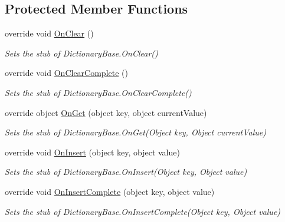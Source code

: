 \subsection*{Protected Member Functions}
\begin{DoxyCompactItemize}
\item 
override void \hyperlink{class_system_1_1_diagnostics_1_1_fakes_1_1_stub_instance_data_collection_a1a05164e201f9a3f1a73df8c33e2c4e9}{On\-Clear} ()
\begin{DoxyCompactList}\small\item\em Sets the stub of Dictionary\-Base.\-On\-Clear()\end{DoxyCompactList}\item 
override void \hyperlink{class_system_1_1_diagnostics_1_1_fakes_1_1_stub_instance_data_collection_a8846ea8f10dc625a1c07a7e8463519c6}{On\-Clear\-Complete} ()
\begin{DoxyCompactList}\small\item\em Sets the stub of Dictionary\-Base.\-On\-Clear\-Complete()\end{DoxyCompactList}\item 
override object \hyperlink{class_system_1_1_diagnostics_1_1_fakes_1_1_stub_instance_data_collection_a4de5c080585fe74e0bef007a33286cae}{On\-Get} (object key, object current\-Value)
\begin{DoxyCompactList}\small\item\em Sets the stub of Dictionary\-Base.\-On\-Get(\-Object key, Object current\-Value)\end{DoxyCompactList}\item 
override void \hyperlink{class_system_1_1_diagnostics_1_1_fakes_1_1_stub_instance_data_collection_a4100c07aa5a132cb57bfcfb4b5508e7d}{On\-Insert} (object key, object value)
\begin{DoxyCompactList}\small\item\em Sets the stub of Dictionary\-Base.\-On\-Insert(\-Object key, Object value)\end{DoxyCompactList}\item 
override void \hyperlink{class_system_1_1_diagnostics_1_1_fakes_1_1_stub_instance_data_collection_a8de1ae9d42587eefa4a22a7761c43a96}{On\-Insert\-Complete} (object key, object value)
\begin{DoxyCompactList}\small\item\em Sets the stub of Dictionary\-Base.\-On\-Insert\-Complete(\-Object key, Object value)\end{DoxyCompactList}\item 

\end{DoxyCompactItemize}
